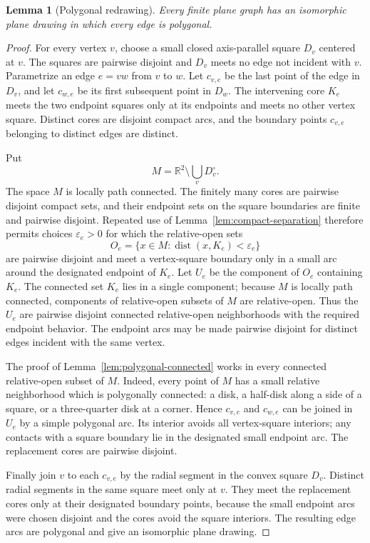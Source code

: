 \documentclass[11pt]{article}
\theoremstyle{mainplain}
\newtheorem{lemma}[theorem]{Lemma}
\theoremstyle{mainroman}
\theoremstyle{definition}
\numberwithin{equation}{section}
\begin{document}
\begin{lemma}[Polygonal redrawing]\label{lem:polygonal-redrawing}
Every finite plane graph has an isomorphic plane drawing in which every
edge is polygonal.
\end{lemma}
\begin{proof}
For every vertex $v$, choose a small closed axis-parallel square
$D_v$ centered at $v$. The squares are pairwise disjoint and $D_v$
meets no edge not incident with $v$. Parametrize an edge $e=vw$ from
$v$ to $w$. Let $c_{v,e}$ be the last point of the edge in $D_v$, and
let $c_{w,e}$ be its first subsequent point in $D_w$. The intervening
core $K_e$ meets the two endpoint squares only at its endpoints and
meets no other vertex square. Distinct cores are disjoint compact arcs,
and the boundary points $c_{v,e}$ belonging to distinct edges are
distinct.

Put
\[
 M=\mathbb R^2\setminus\bigcup_v D_v^\circ.
\]
The space $M$ is locally path connected. The finitely many cores
are pairwise disjoint compact sets, and their endpoint sets on the
square boundaries are finite and pairwise disjoint. Repeated use of
Lemma~\ref{lem:compact-separation} therefore permits choices
$\varepsilon_e>0$ for which the relative-open sets
\[
 O_e=\{x\in M:\operatorname{dist}(x,K_e)<\varepsilon_e\}
\]
are pairwise disjoint and meet a vertex-square boundary only in a small
arc around the designated endpoint of $K_e$. Let $U_e$ be the
component of $O_e$ containing $K_e$. The connected set $K_e$ lies in a
single component; because $M$ is locally path connected, components of
relative-open subsets of $M$ are relative-open. Thus the $U_e$ are
pairwise disjoint connected relative-open neighborhoods with the
required endpoint behavior. The endpoint arcs may be made pairwise
disjoint for distinct edges incident with the same vertex.

The proof of Lemma~\ref{lem:polygonal-connected} works in every connected
relative-open subset of $M$. Indeed, every point of $M$ has a small
relative neighborhood which is polygonally connected: a disk, a
half-disk along a side of a square, or a three-quarter disk at a
corner. Hence $c_{v,e}$ and $c_{w,e}$ can be joined in $U_e$ by a
simple polygonal arc. Its interior avoids all vertex-square interiors;
any contacts with a square boundary lie in the designated small
endpoint arc. The replacement cores are pairwise disjoint.

Finally join $v$ to each $c_{v,e}$ by the radial segment in the convex
square $D_v$. Distinct radial segments in the same square meet only at
$v$. They meet the replacement cores only at their designated boundary
points, because the small endpoint arcs were chosen disjoint and the
cores avoid the square interiors. The resulting edge arcs are
polygonal and give an isomorphic plane drawing.
\end{proof}
\end{document}
